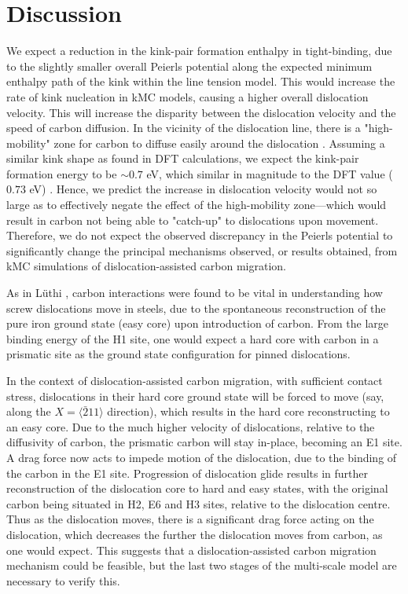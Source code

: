 \documentclass[a4paper,11pt]{article}
\begin{document}
\section{Discussion}
\label{sec:org34b1539}
\label{sec:discussion}


We expect a reduction in the kink-pair formation enthalpy in tight-binding, due to
the slightly smaller overall Peierls potential along the expected minimum enthalpy
path of the kink within the line tension model. This would increase
the rate of kink nucleation in kMC models, causing a higher overall dislocation
velocity. This will increase the disparity between the dislocation velocity and
the speed of carbon diffusion. In the vicinity of the dislocation line, there is a
"high-mobility" zone for carbon to diffuse easily around the dislocation
\cite{Nematollahi2016}. Assuming a similar kink shape as found in DFT calculations,
we expect the kink-pair formation energy to be \(\sim 0.7\) eV, which similar in
magnitude to the DFT value (\(0.73\) eV) \cite{Itakura2012}. Hence, we predict the
increase in dislocation velocity would not so large as to effectively negate the
effect of the high-mobility zone---which would result in carbon not being able to
"catch-up" to dislocations upon movement. Therefore, we do not expect the observed
discrepancy in the Peierls potential to significantly change the principal
mechanisms observed, or results obtained, from kMC simulations of
dislocation-assisted carbon migration.



As in Lüthi \cite{Lthi2019}, carbon interactions were found to be vital in understanding how screw
dislocations move in steels, due to the spontaneous reconstruction of the pure iron ground state
(easy core) upon introduction of carbon. From the large binding energy of the H1 site, one would
expect a hard core with carbon in a prismatic site as the ground state configuration for pinned
dislocations.

In the context of dislocation-assisted carbon migration, with sufficient contact stress,
dislocations in their hard core ground state will be forced to move (say, along the \(X =
    \langle\bar{2}11\rangle\) direction), which results in the hard core reconstructing to an easy core. Due to
the much higher velocity of dislocations, relative to the diffusivity of carbon, the
prismatic carbon will stay in-place, becoming an E1 site. A drag force now acts to impede motion of the
dislocation, due to the binding of the carbon in the E1 site. Progression of dislocation glide
results in further reconstruction of the dislocation core to hard and easy states, with the
original carbon being situated in H2, E6 and H3 sites, relative to the dislocation
centre. Thus as the dislocation moves, there is a significant drag force acting on the
dislocation, which decreases the further the dislocation moves from carbon, as one would
expect. This suggests that a dislocation-assisted carbon migration mechanism could be feasible,
but the last two stages of the multi-scale model are necessary to verify this.
\end{document}
